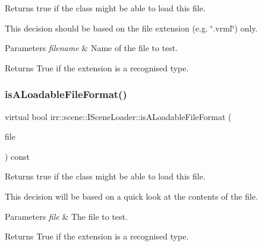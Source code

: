 Returns true if the class might be able to load this file. 

This decision should be based on the file extension (e.\+g. \char`\"{}.\+vrml\char`\"{}) only. 
\begin{DoxyParams}{Parameters}
{\em filename} & Name of the file to test. \\
\hline
\end{DoxyParams}
\begin{DoxyReturn}{Returns}
True if the extension is a recognised type. 
\end{DoxyReturn}
\mbox{\label{classirr_1_1scene_1_1ISceneLoader_a5f1b2f44fcac12acdc2f1948d8f3b258}} 
\subsubsection{\texorpdfstring{is\+A\+Loadable\+File\+Format()}{isALoadableFileFormat()}\hspace{0.1cm}{\footnotesize\ttfamily [1/2]}}
{\footnotesize\ttfamily virtual bool irr\+::scene\+::\+I\+Scene\+Loader\+::is\+A\+Loadable\+File\+Format (\begin{DoxyParamCaption}\item[{\hyperlink{classirr_1_1io_1_1IReadFile}{io\+::\+I\+Read\+File} $\ast$}]{file }\end{DoxyParamCaption}) const\hspace{0.3cm}{\ttfamily [pure virtual]}}



Returns true if the class might be able to load this file. 

This decision will be based on a quick look at the contents of the file. 
\begin{DoxyParams}{Parameters}
{\em file} & The file to test. \\
\hline
\end{DoxyParams}
\begin{DoxyReturn}{Returns}
True if the extension is a recognised type. 
\end{DoxyReturn}
\mbox{\label{classirr_1_1scene_1_1ISceneLoader_a5f1b2f44fcac12acdc2f1948d8f3b258}} 
